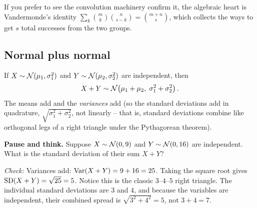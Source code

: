 If you prefer to see the convolution machinery confirm it, the algebraic
heart is Vandermonde's identity
$\sum_{k}\binom{m}{k}\binom{n}{s-k}=\binom{m+n}{s}$, which collects the
ways to get $s$ total successes from the two groups.

\subsection{Normal plus normal}

\begin{theorem}
\label{ch17:thm-normal-add}
If $X\sim\mathcal{N}(\mu_1,\sigma_1^2)$ and $Y\sim\mathcal{N}(\mu_2,\sigma_2^2)$
are independent, then
\[
X+Y \sim \mathcal{N}\!\left(\mu_1+\mu_2,\;\sigma_1^2+\sigma_2^2\right).
\]
The means add and the \emph{variances} add (so the standard deviations add
in quadrature, $\sqrt{\sigma_1^2+\sigma_2^2}$, not linearly -- that is,
standard deviations combine like orthogonal legs of a right triangle
under the Pythagorean theorem).
\end{theorem}

\begin{recoverybox}
\textbf{Pause and think.} Suppose $X \sim \mathcal{N}(0, 9)$ and $Y \sim \mathcal{N}(0, 16)$ are independent. What is the standard deviation of their sum $X+Y$?

\emph{Check:} Variances add: $\operatorname{Var}(X+Y) = 9 + 16 = 25$. Taking the square root gives $\operatorname{SD}(X+Y) = \sqrt{25} = 5$. Notice this is the classic $3\text{--}4\text{--}5$ right triangle. The individual standard deviations are $3$ and $4$, and because the variables are independent, their combined spread is $\sqrt{3^2 + 4^2} = 5$, not $3 + 4 = 7$.
\end{recoverybox}

